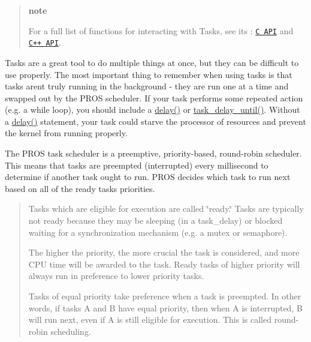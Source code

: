 \begin{quote}
{\bfseries note}

For a full list of functions for interacting with Tasks, see its \+: \href{../../api/c/rtos.html}{\tt C A\+PI} and \href{../../api/cpp/rtos.html}{\tt C++ A\+PI}.

\end{quote}
Tasks are a great tool to do multiple things at once, but they can be difficult to use properly. The most important thing to remember when using tasks is that tasks aren\textquotesingle{}t truly running in the background -\/ they are run one at a time and swapped out by the P\+R\+OS scheduler. If your task performs some repeated action (e.\+g. a {\ttfamily while} loop), you should include a {\ttfamily \hyperlink{rtos_8h_ab8c5a8048d5576a33d7f79b95a2fa0dd}{delay()}} or {\ttfamily \hyperlink{rtos_8h_a61c8ccf83a0dc79fc0e9fde5e87a0329}{task\+\_\+delay\+\_\+until()}}. Without a {\ttfamily \hyperlink{rtos_8h_ab8c5a8048d5576a33d7f79b95a2fa0dd}{delay()}} statement, your task could starve the processor of resources and prevent the kernel from running properly.

The P\+R\+OS task scheduler is a preemptive, priority-\/based, round-\/robin scheduler. This means that tasks are preempted (interrupted) every millisecond to determine if another task ought to run. P\+R\+OS decides which task to run next based on all of the ready tasks\textquotesingle{} priorities.

\begin{quote}

\begin{DoxyItemize}
\item Tasks which are eligible for execution are called \char`\"{}ready.\char`\"{} Tasks are typically not ready because they may be sleeping (in a {\ttfamily task\+\_\+delay}) or blocked waiting for a synchronization mechanism (e.\+g. a mutex or semaphore).
\item The higher the priority, the more crucial the task is considered, and more C\+PU time will be awarded to the task. Ready tasks of higher priority will always run in preference to lower priority tasks.
\item Tasks of equal priority take preference when a task is preempted. In other words, if tasks A and B have equal priority, then when A is interrupted, B will run next, even if A is still eligible for execution. This is called round-\/robin scheduling. 
\end{DoxyItemize}\end{quote}


